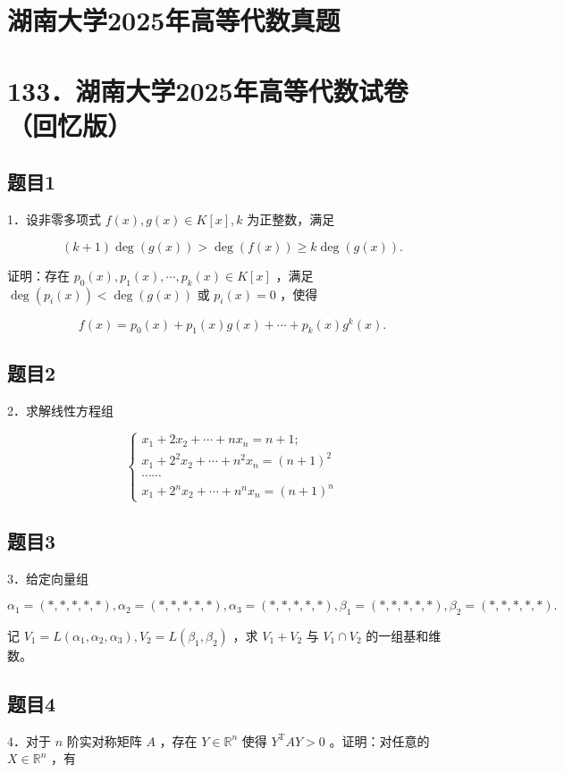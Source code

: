 \documentclass{article}
\begin{document}
\section*{湖南大学2025年高等代数真题}
\section*{133．湖南大学2025年高等代数试卷（回忆版）}

\subsection{题目1}
1．设非零多项式 \(f(x), g(x) \in K[x], k\) 为正整数，满足

\[
(k+1) \operatorname{deg}(g(x))>\operatorname{deg}(f(x)) \geq k \operatorname{deg}(g(x)) .
\]

证明：存在 \(p_{0}(x), p_{1}(x), \cdots, p_{k}(x) \in K[x]\) ，满足 \(\operatorname{deg}\left(p_{i}(x)\right)<\operatorname{deg}(g(x))\) 或 \(p_{i}(x)=0\) ，使得

\[
f(x)=p_{0}(x)+p_{1}(x) g(x)+\cdots+p_{k}(x) g^{k}(x) .
\]

\subsection{题目2}
2．求解线性方程组

\[
\left\{\begin{array}{c}
x_{1}+2 x_{2}+\cdots+n x_{n}=n+1 ; \\
x_{1}+2^{2} x_{2}+\cdots+n^{2} x_{n}=(n+1)^{2} \\
\cdots \cdots \\
x_{1}+2^{n} x_{2}+\cdots+n^{n} x_{n}=(n+1)^{n}
\end{array}\right.
\]

\subsection{题目3}
3．给定向量组

\[
\alpha_{1}=(*, *, *, *, *), \alpha_{2}=(*, *, *, *, *), \alpha_{3}=(*, *, *, *, *), \beta_{1}=(*, *, *, *, *), \beta_{2}=(*, *, *, *, *) .
\]

记 \(V_{1}=L\left(\alpha_{1}, \alpha_{2}, \alpha_{3}\right), V_{2}=L\left(\beta_{1}, \beta_{2}\right)\) ，求 \(V_{1}+V_{2}\) 与 \(V_{1} \cap V_{2}\) 的一组基和维数。

\subsection{题目4}
4．对于 \(n\) 阶实对称矩阵 \(A\) ，存在 \(Y \in \mathbb{R}^{n}\) 使得 \(Y^{\mathrm{T}} A Y>0\) 。证明：对任意的 \(X \in \mathbb{R}^{n}\) ，有
\end{document}

